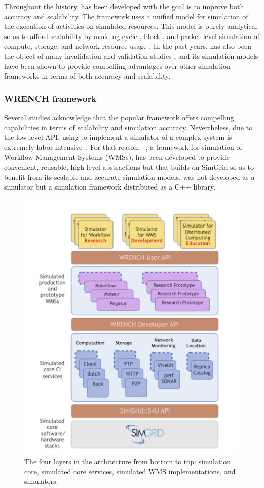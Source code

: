 Throughout the history, \simgrid has been developed with the goal 
is to improve both accuracy and scalability. 
The framework uses a unified model for simulation of the execution of activities 
on simulated resources.
This model is purely analytical so as to afford scalability by avoiding cycle-, 
block-, and packet-level simulation of compute, storage, and network 
resource usage \cite{casanova2014simgrid}.
In the past years, \simgrid has also been the object of many invalidation and 
validation studies \cite{bedaride2013toward,velho2013validity,
velho2009accuracy,lebre2015}, and its simulation models 
have been shown to provide compelling advantages over other simulation 
frameworks in terms of both accuracy and scalability.

\subsubsection{WRENCH framework}

Several studies acknowledge that the popular \simgrid framework
offers compelling capabilities in terms of scalability and simulation accuracy.
Nevertheless, due to the low-level API, using \simgrid to implement 
a simulator of a complex system is extremely labor-intensive~\cite{kecskemeti_2014}. 
For that reason, \wrench ~\cite{casanova2020fgcs}, a framework for 
simulation of Workflow Management Systems (WMSs), has been developed 
to provide convenient, reusable, high-level abstractions but that builds on 
SimGrid so as to benefit from its scalable and accurate simulation models.
\wrench was not developed as a simulator but a simulation framework 
distributed as a C++ library. 

\begin{figure}[!h]
     \centering
     \includegraphics[width=0.75\linewidth]{figures/wrench.png}
     \caption{The four layers in the \wrench architecture from bottom 
     to top: simulation core, simulated core services, 
     simulated WMS implementations, and simulators.}
     \label{fig:wrench}
\end{figure}

